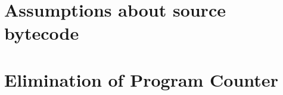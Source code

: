 
\section{Assumptions about source bytecode}
\label{compilation-assumptions-section}



\section{Elimination of Program Counter}
\label{elimination-of-program-counter-section}

